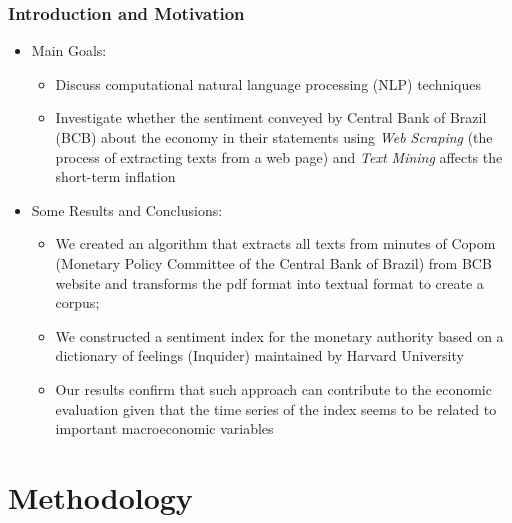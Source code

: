 \documentclass[aspectratio=169]{beamer}
\begin{document}
\begin{frame}\frametitle{Introduction and Motivation}
  \begin{itemize}
  \item Main Goals:
    \begin{itemize}
    	\item Discuss computational natural
    	language processing (NLP) techniques
    	\item Investigate whether the
    	sentiment conveyed by Central Bank of Brazil (BCB) about the economy in their statements using \emph{Web Scraping} (the process of extracting texts from a web page) and \emph{Text Mining} affects the short-term inflation 
    \end{itemize}
  \item Some Results and Conclusions:
    \begin{itemize}
      \item We created an algorithm that extracts all texts from minutes of Copom (Monetary Policy Committee of the Central Bank of Brazil) from BCB website and transforms the pdf format into textual format to create a corpus;
      \item We constructed a sentiment index for the monetary authority based on a dictionary of feelings (Inquider) maintained by Harvard
      University
      \item Our results confirm that such approach can contribute to the economic evaluation given that the time series of the index seems to be related to important macroeconomic variables
    \end{itemize}
  \end{itemize}
\end{frame}


\section{Methodology}
\end{document}
